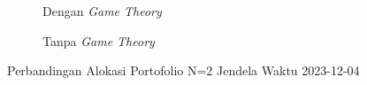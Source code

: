 \begin{figure}[!htbp]\centering\begin{subfigure}[b]{0.48\textwidth}\centering


\caption{Dengan \textit{Game Theory}}\end{subfigure}\hfill\begin{subfigure}[b]{0.48\textwidth}\centering


\caption{Tanpa \textit{Game Theory}}\end{subfigure}\caption{Perbandingan Alokasi Portofolio N=2 Jendela Waktu 2023-12-04}\label{fig:window_2023_12_04}\end{figure}
